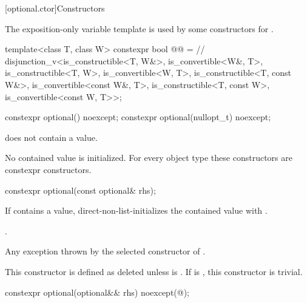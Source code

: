 [optional.ctor]{Constructors}

\pnum
The exposition-only variable template 
is used by some constructors for .
\begin{codeblock}
template<class T, class W>
constexpr bool @@ =  // \expos
  disjunction_v<is_constructible<T, W&>, is_convertible<W&, T>,
                is_constructible<T, W>, is_convertible<W, T>,
                is_constructible<T, const W&>, is_convertible<const W&, T>,
                is_constructible<T, const W>, is_convertible<const W, T>>;
\end{codeblock}

%
\begin{itemdecl}
constexpr optional() noexcept;
constexpr optional(nullopt_t) noexcept;
\end{itemdecl}

\begin{itemdescr}
\pnum
\ensures
{} does not contain a value.

\pnum
\remarks
No contained value is initialized.
For every object type  these constructors are constexpr constructors.
\end{itemdescr}

%
\begin{itemdecl}
constexpr optional(const optional& rhs);
\end{itemdecl}

\begin{itemdescr}
\pnum
\effects
If  contains a value, direct-non-list-initializes the contained value
with .

\pnum
\ensures
{}.

\pnum
\throws
Any exception thrown by the selected constructor of .

\pnum
\remarks
This constructor is defined as deleted unless
 is .
If  is ,
this constructor is trivial.
\end{itemdescr}

%
\begin{itemdecl}
constexpr optional(optional&& rhs) noexcept(@\seebelow@);
\end{itemdecl}

